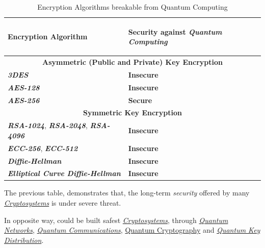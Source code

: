 \documentclass[conference]{IEEEtran}
\begin{document}
\begin{table}[!hp]
\centering
    \caption{Encryption Algorithms breakable from Quantum Computing}
    \begin{tabular}{ |p{4cm}|p{2.5cm}| }
     \hline
     \begin{center}
     \textbf{Encryption Algorithm}\end{center} & \begin{center}\textbf{Security against \textit{Quantum Computing}}\end{center}\\
     \hline
     \hline
     \multicolumn{2}{|c|}{\textbf{Asymmetric (Public and Private) Key Encryption}} \\
     \hline
     \hline
     \textit{\textbf{3DES}} & \textbf{Insecure} \\
     \hline
     \textit{\textbf{AES-128}} & \textbf{Insecure} \\
     \hline
     \textit{\textbf{AES-256}} & \textbf{Secure} \\
     \hline
     \hline
     \multicolumn{2}{|c|}{\textbf{Symmetric Key Encryption}} \\
     \hline
     \hline
     \textit{\textbf{RSA-1024}}, \textit{\textbf{RSA-2048}}, \textit{\textbf{RSA-4096}} & \textbf{Insecure} \\
     \hline
     \textit{\textbf{ECC-256}}, \textit{\textbf{ECC-512}} & \textbf{Insecure} \\
     \hline
     \textit{\textbf{Diffie-Hellman}} & \textbf{Insecure} \\
     \hline
     \textit{\textbf{Elliptical Curve Diffie-Hellman}} & \textbf{Insecure} \\
     \hline
    \end{tabular}
\end{table}

\newpage

The previous table, demonstrates that, the long-term \textit{security} offered by many \href{https://en.wikipedia.org/wiki/Cryptosystem}{\textit{Cryptosystems}} is under severe threat.

\vspace{4pt}

In opposite way, could be built safest \href{https://en.wikipedia.org/wiki/Cryptosystem}{\textit{Cryptosystems}}, through \href{https://en.wikipedia.org/wiki/Quantum_network}{\textit{Quantum Networks}}, \href{https://en.wikipedia.org/wiki/Quantum_information_science}{\textit{Quantum Communications}}, \href{https://en.wikipedia.org/wiki/Quantum_cryptography}{Quantum Cryptography} and \href{https://en.wikipedia.org/wiki/Quantum_key_distribution}{\textit{Quantum Key Distribution}}.
\end{document}
